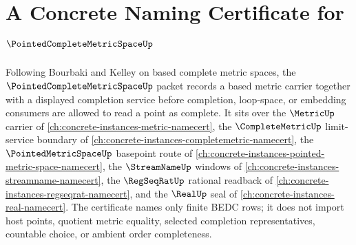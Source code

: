 \chapter{A Concrete Naming Certificate for $\PointedCompleteMetricSpaceUp$}
\label{ch:concrete-instances-pointed-complete-metric-space-namecert}

Following Bourbaki and Kelley on based complete metric spaces, the
$\PointedCompleteMetricSpaceUp$ packet records a based metric carrier together
with a displayed completion service before completion, loop-space, or
embedding consumers are allowed to read a point as complete. It sits over the
$\MetricUp$ carrier of \autoref{ch:concrete-instances-metric-namecert}, the
$\CompleteMetricUp$ limit-service boundary of
\autoref{ch:concrete-instances-completemetric-namecert}, the
$\PointedMetricSpaceUp$ basepoint route of
\autoref{ch:concrete-instances-pointed-metric-space-namecert}, the
$\StreamNameUp$ windows of \autoref{ch:concrete-instances-streamname-namecert},
the $\RegSeqRatUp$ rational readback of
\autoref{ch:concrete-instances-regseqrat-namecert}, and the $\RealUp$ seal of
\autoref{ch:concrete-instances-real-namecert}. The certificate names only
finite BEDC rows; it does not import host points, quotient metric equality,
selected completion representatives, countable choice, or ambient order
completeness.

